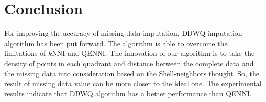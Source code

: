 \documentclass[print]{jicspack}
\begin{document}
\section{Conclusion}
For improving the accuracy of missing data imputation, DDWQ imputation algorithm has been put forward. The algorithm is able to overcome the limitations of $k$NNI and QENNI. The innovation of our algorithm is to take the density of points in each quadrant and distance between the complete data and the missing data into consideration based on the Shell-neighbors thought. So, the result of missing data value can be more closer to the ideal one. The experimental results indicate that DDWQ algorithm has a better performance than QENNI.

\begin{thebibliography}{00}\label{ref:ref}






\end{thebibliography}
\end{document}

